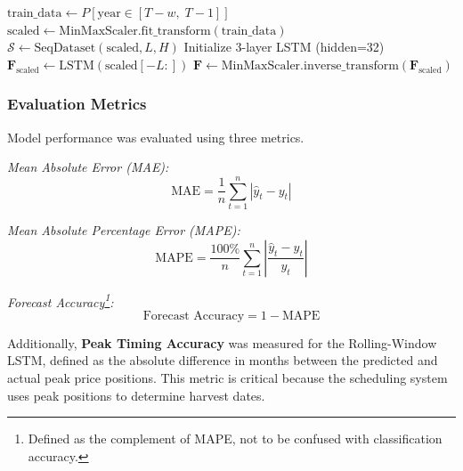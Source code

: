 \documentclass[journal]{IEEEtran}
\begin{document}
\begin{algorithm}[htbp]
\SetAlgoLined
{}
$\text{train\_data} \leftarrow P[\text{year} \in [T{-}w,\; T{-}1]]$\;
$\text{scaled} \leftarrow \text{MinMaxScaler.fit\_transform}(\text{train\_data})$\;
$\mathcal{S} \leftarrow \text{SeqDataset}(\text{scaled}, L, H)$ 
Initialize 3-layer LSTM (hidden=32)\;
$\mathbf{F}_\text{scaled} \leftarrow \text{LSTM}(\text{scaled}[-L:])$\;
$\mathbf{F} \leftarrow \text{MinMaxScaler.inverse\_transform}(\mathbf{F}_\text{scaled})$\;
\caption{Rolling-Window LSTM Training and Prediction}
\label{alg:rwlstm}
\end{algorithm}

\subsubsection{Evaluation Metrics}

Model performance was evaluated using three metrics.

\textit{Mean Absolute Error (MAE):}
\begin{equation}
  \text{MAE} = \frac{1}{n}\sum_{t=1}^{n}|\hat{y}_t - y_t|
\end{equation}

\textit{Mean Absolute Percentage Error (MAPE):}
\begin{equation}
  \text{MAPE} = \frac{100\%}{n}\sum_{t=1}^{n}\left|\frac{\hat{y}_t - y_t}{y_t}\right|
\end{equation}

\textit{Forecast Accuracy\footnote{Defined as the complement of MAPE, not to be confused with classification accuracy.}:}
\begin{equation}
  \text{Forecast Accuracy} = 1 - \text{MAPE}
\end{equation}

Additionally, \textbf{Peak Timing Accuracy} was measured for the Rolling-Window LSTM, defined as the absolute difference in months between the predicted and actual peak price positions. This metric is critical because the scheduling system uses peak positions to determine harvest dates.
\end{document}

